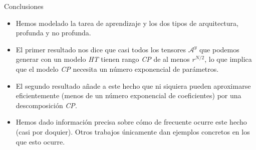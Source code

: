 \begin{frame}{Conclusiones}
	\begin{itemize}
		\item Hemos modelado la tarea de aprendizaje y los dos tipos de arquitectura, profunda y no profunda.
		\item El primer resultado nos dice que casi todos los tensores $\mathcal{A}^y$ que podemos generar con un modelo \textit{HT} tienen rango \textit{CP} de al menos $r^{N/2}$, lo que implica que el modelo \textit{CP} necesita un número exponencial de parámetros.
		\item El segundo resultado añade a este hecho que ni siquiera pueden aproximarse eficientemente (menos de un número exponencial de coeficientes) por una descomposición \textit{CP}.
		\item Hemos dado información precisa sobre cómo de frecuente ocurre este hecho (casi por doquier). Otros trabajos  únicamente dan ejemplos concretos en los que esto ocurre.
	\end{itemize}
\end{frame}
